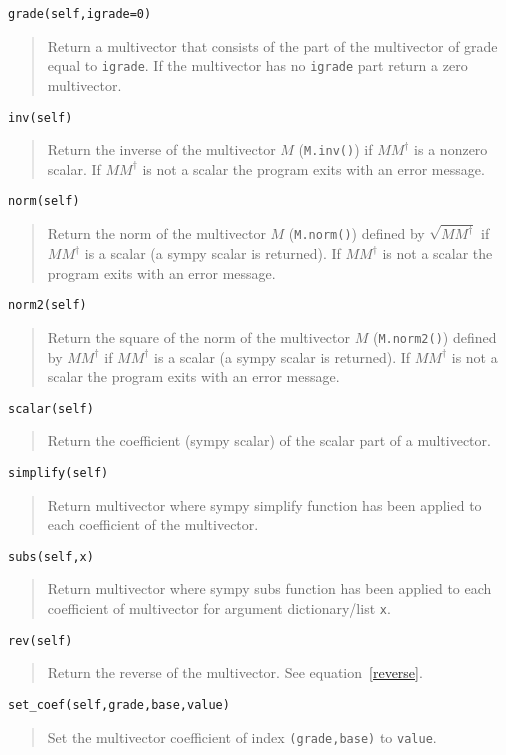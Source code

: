 \documentclass[10pt]{article}
\newcommand{\R}{\dagger}
\newcommand{\T}[1]{\texttt{#1}}
\begin{document}
\T{grade(self,igrade=0)}
\begin{quote}
    Return a multivector that consists of the part of the multivector of
    grade equal to \T{igrade}.  If the multivector has no \T{igrade} part
    return a zero multivector.
\end{quote}

\T{inv(self)}
\begin{quote}
   Return the inverse of the multivector $M$ (\T{M.inv()}) if $MM^{\R}$ is a nonzero scalar.  If $MM^{\R}$
   is not a scalar the program exits with an error message.
\end{quote}

\T{norm(self)}
\begin{quote}
   Return the norm of the multivector $M$ (\T{M.norm()}) defined by $\sqrt{MM^{\R}}$ if $MM^{\R}$ is a scalar (a sympy scalar 
   is returned).  If $MM^{\R}$ is not a scalar the program exits with an error message.
\end{quote}

\T{norm2(self)}
\begin{quote}
   Return the square of the norm of the multivector $M$ (\T{M.norm2()}) defined by $MM^{\R}$ if $MM^{\R}$ is a scalar (a sympy scalar 
   is returned).  If $MM^{\R}$ is not a scalar the program exits with an error message.
\end{quote}

\T{scalar(self)}
\begin{quote}
    Return the coefficient (sympy scalar) of the scalar part of a
    multivector.
\end{quote}

\T{simplify(self)}
\begin{quote}
   Return multivector where sympy simplify function has been applied to
   each coefficient of the multivector.
\end{quote}

\T{subs(self,x)}
\begin{quote}
   Return multivector where sympy subs function has been applied to each
   coefficient of multivector for argument dictionary/list \T{x}.
\end{quote}

\T{rev(self)}
\begin{quote}
   Return the reverse of the multivector.  See equation~\ref{reverse}.
\end{quote}

\T{set\_coef(self,grade,base,value)}
\begin{quote}
   Set the multivector coefficient of index \T{(grade,base)} to \T{value}.
\end{quote}
\end{document}
